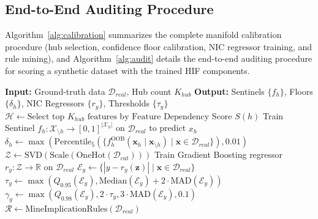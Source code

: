 \documentclass[pdflatex,sn-mathphys-num]{sn-jnl}
\theoremstyle{thmstyleone}%
\theoremstyle{thmstyletwo}%
\theoremstyle{thmstylethree}%
\begin{document}
\begin{appendices}
\section{End-to-End Auditing Procedure}\label{app:calibration}

Algorithm~\ref{alg:calibration} summarizes the complete manifold calibration procedure (hub selection, confidence floor calibration, NIC regressor training, and rule mining), and Algorithm~\ref{alg:audit} details the end-to-end auditing procedure for scoring a synthetic dataset with the trained HIF components.

\begin{algorithm}[ht]
\caption{HIF Manifold Calibration}
\label{alg:calibration}
\begin{algorithmic}[1]
\Statex \textbf{Input:} Ground-truth data $\mathcal{D}_{real}$, Hub count $K_{hub}$
\Statex \textbf{Output:} Sentinels $\{f_h\}$, Floors $\{\delta_h\}$, NIC Regressors $\{r_y\}$, Thresholds $\{\tau_y\}$
\State $\mathcal{H} \leftarrow \text{Select top } K_{hub} \text{ features by Feature Dependency Score } S(h)$
    \State Train Sentinel $f_h: \mathcal{X}_{\setminus h} \to [0, 1]^{|\mathcal{X}_h|}$ on $\mathcal{D}_{real}$ to predict $x_h$
    \State $\delta_h \leftarrow \max( \text{Percentile}_{5} ( \{ f_h^{\text{OOB}}(\mathbf{x}_h \mid \mathbf{x}_{\setminus h}) \mid \mathbf{x} \in \mathcal{D}_{real} \} ), 0.01)$
\EndFor
\State $\mathcal{Z} \leftarrow \text{SVD}(\text{Scale}(\text{OneHot}(\mathcal{D}_{cat})))$ 
    \State Train Gradient Boosting regressor $r_y: \mathcal{Z} \to \mathbb{R}$ on $\mathcal{D}_{real}$
    \State $\mathcal{E}_y \leftarrow \{ |y - r_y(\mathbf{z})| \mid \mathbf{x} \in \mathcal{D}_{real} \}$ 
    \State $\tau_y \leftarrow \max(Q_{0.95}(\mathcal{E}_y), \text{Median}(\mathcal{E}_y) + 2 \cdot \text{MAD}(\mathcal{E}_y))$ 
    \State $\gamma_y \leftarrow \max(Q_{0.98}(\mathcal{E}_y), 2 \cdot \tau_y, 3 \cdot \text{MAD}(\mathcal{E}_y), 0.1)$ 
\EndFor
\State $\mathcal{R} \leftarrow \text{MineImplicationRules}(\mathcal{D}_{real})$ 
\end{algorithmic}
\end{algorithm}


\end{appendices}
\end{document}
